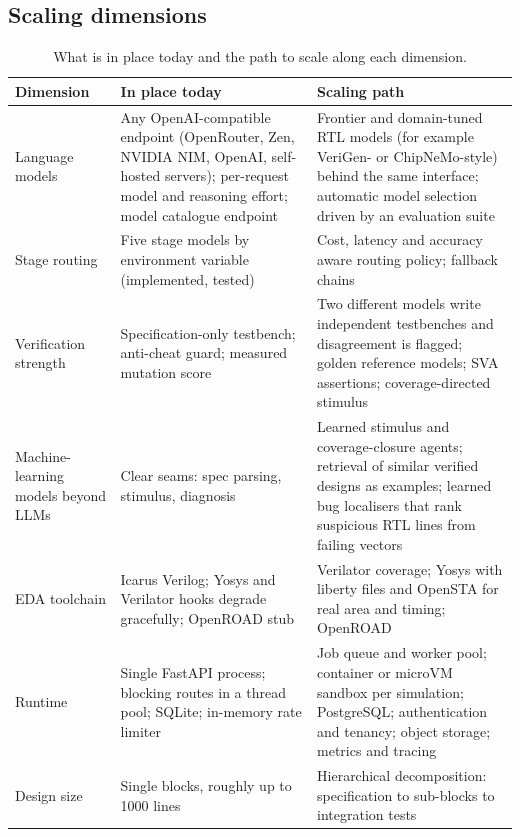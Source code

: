 \documentclass[11pt,a4paper]{article}
\begin{document}
\subsection{Scaling dimensions}
\begin{table}[H]
\centering
\caption{What is in place today and the path to scale along each dimension.}
\label{tab:scale}
\footnotesize
\begin{tabularx}{\textwidth}{@{}p{2.5cm}XX@{}}
\toprule
\textbf{Dimension} & \textbf{In place today} & \textbf{Scaling path} \\
\midrule
Language models & Any OpenAI-compatible endpoint (OpenRouter, Zen, NVIDIA NIM, OpenAI, self-hosted servers); per-request model and reasoning effort; model catalogue endpoint & Frontier and domain-tuned RTL models (for example VeriGen- or ChipNeMo-style) behind the same interface; automatic model selection driven by an evaluation suite \\
Stage routing & Five stage models by environment variable (implemented, tested) & Cost, latency and accuracy aware routing policy; fallback chains \\
Verification strength & Specification-only testbench; anti-cheat guard; measured mutation score & Two different models write independent testbenches and disagreement is flagged; golden reference models; SVA assertions; coverage-directed stimulus \\
Machine-learning models beyond LLMs & Clear seams: spec parsing, stimulus, diagnosis & Learned stimulus and coverage-closure agents; retrieval of similar verified designs as examples; learned bug localisers that rank suspicious RTL lines from failing vectors \\
EDA toolchain & Icarus Verilog; Yosys and Verilator hooks degrade gracefully; OpenROAD stub & Verilator coverage; Yosys with liberty files and OpenSTA for real area and timing; OpenROAD \\
Runtime & Single FastAPI process; blocking routes in a thread pool; SQLite; in-memory rate limiter & Job queue and worker pool; container or microVM sandbox per simulation; PostgreSQL; authentication and tenancy; object storage; metrics and tracing \\
Design size & Single blocks, roughly up to 1000 lines & Hierarchical decomposition: specification to sub-blocks to integration tests \\
\bottomrule
\end{tabularx}
\end{table}
\end{document}
